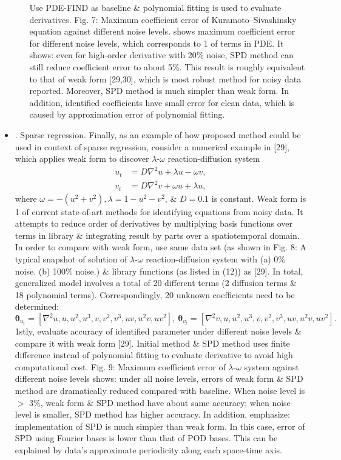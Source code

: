 \documentclass{article}
\begin{document}
\begin{itemize}
\begin{itemize}
		Use PDE-FIND as baseline \& polynomial fitting is used to evaluate derivatives. {\sf Fig. 7: Maximum coefficient error of Kuramoto--Sivashinsky equation against different noise levels.} shows maximum coefficient error for different noise levels, which corresponds to 1 of terms in PDE. It shows: even for high-order derivative with 20\% noise, SPD method can still reduce coefficient error to about 5\%. This result is roughly equivalent to that of weak form [29,30], which is most robust method for noisy data reported. Moreover, SPD method is much simpler than weak form. In addition, identified coefficients have small error for clean data, which is caused by approximation error of polynomial fitting.
	\end{itemize}
	\item {. Sparse regression.} Finally, as an example of how proposed method could be used in context of sparse regression, consider a numerical example in [29], which applies weak form to discover $\lambda$-$\omega$ reaction-diffusion system
	\begin{align}
		u_t &= D\nabla^2u + \lambda u - \omega v,\\
		v_t &= D\nabla^2v + \omega u + \lambda u,
	\end{align}
	where $\omega = -(u^2 + v^2),\lambda = 1 - u^2 - v^2$, \& $D = 0.1$ is constant. Weak form is 1 of current state-of-art methods for identifying equations from noisy data. It attempts to reduce order of derivatives by multiplying basis functions over terms in library \& integrating result by parts over a spatiotemporal domain. In order to compare with weak form, use same data set (as shown in {\sf Fig. 8: A typical snapshot of solution of $\lambda$-$\omega$ reaction-diffusion system with (a) 0\% noise. (b) 100\% noise.}) \& library functions (as listed in (12)) as [29]. In total, generalized model involves a total of 20 different terms (2 diffusion terms \& 18 polynomial terms). Correspondingly, 20 unknown coefficients need to be determined:
	\begin{equation}
		\boldsymbol{\theta}_{u_t} = [\nabla^2u,u,u^2,u^3,v,v^2,v^3,uv,u^2v,uv^2],\ \boldsymbol{\theta}_{v_t} = [\nabla^2v,u,u^2,u^3,v,v^2,v^3,uv,u^2v,uv^2].
	\end{equation}
	1stly, evaluate accuracy of identified parameter under different noise levels \& compare it with weak form [29]. Initial method \& SPD method uses finite difference instead of polynomial fitting to evaluate derivative to avoid high computational cost. {\sf Fig. 9: Maximum coefficient error of $\lambda$-$\omega$ system against different noise levels} shows: under all noise levels, errors of weak form \& SPD method are dramatically reduced compared with baseline. When noise level is $>$ 3\%, weak form \& SPD method have about same accuracy; when noise level is smaller, SPD method has higher accuracy. In addition, emphasize: implementation of SPD is much simpler than weak form. In this case, error of SPD using Fourier bases is lower than that of POD bases. This can be explained by data's approximate periodicity along each space-time axis.
	

\end{itemize}
\end{document}
